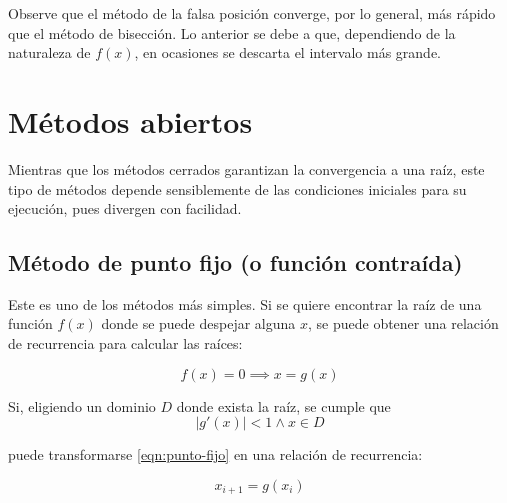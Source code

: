 Observe que el método de la falsa posición converge, por lo general, más rápido
que el método de bisección. Lo anterior se debe a que, dependiendo de la
naturaleza de $f(x)$, en ocasiones se descarta el intervalo más grande.


\section{Métodos abiertos}

Mientras que los métodos cerrados garantizan la convergencia a una raíz, este
tipo de métodos depende sensiblemente de las condiciones iniciales para su
ejecución, pues divergen con facilidad.

\subsection{Método de punto fijo (o función contraída)}

Este es uno de los métodos más simples. Si se quiere encontrar la raíz de una
función $f(x)$ donde se puede despejar alguna $x$, se puede obtener una
relación de recurrencia para calcular las raíces:

\begin{equation}\label{eqn:punto-fijo}
    f(x) = 0 \implies \boxed{x = g(x)}
\end{equation}

Si, eligiendo un dominio $D$ donde exista la raíz, se cumple que
\[
    \left| g'(x) \right| < 1 \land x \in D
\]

\noindent puede transformarse \ref{eqn:punto-fijo} en una relación de
recurrencia:

\begin{equation} \label{eqn:recurrencia-punto-fijo}
    \boxed{x_{i+1} = g(x_i)}
\end{equation}

